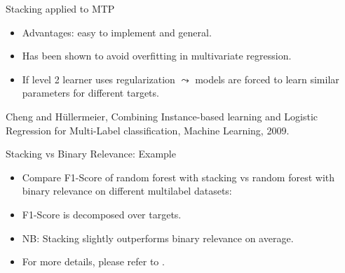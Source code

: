 \documentclass[11pt,compress,t,notes=noshow, xcolor=table]{beamer}
\begin{document}
\begin{frame}{Stacking applied to MTP }
	\begin{itemize}
		\item Advantages: easy to implement and general. 
        
		\item Has been shown to avoid overfitting in multivariate regression.
        
		\item If level 2 learner uses regularization $\leadsto$ models are forced to learn similar parameters for different targets.  
	\end{itemize}

	{\tiny Cheng and H\"ullermeier, Combining Instance-based learning and Logistic Regression for Multi-Label classification, Machine Learning, 2009.}
	
\end{frame}

\begin{frame}{Stacking vs Binary Relevance: Example}

   \begin{itemize}
   
       \item Compare F1-Score of random forest with stacking vs random forest with binary relevance on different multilabel datasets:
       
       \begin{center}
       \end{center}
       
       \item F1-Score is decomposed over targets.

       \item NB: Stacking slightly outperforms binary relevance on average.

       \item For more details, please refer to \href{https://journal.r-project.org/archive/2017/RJ-2017-012/RJ-2017-012.pdf}{}.
   \end{itemize}

\end{frame}
\end{document}

